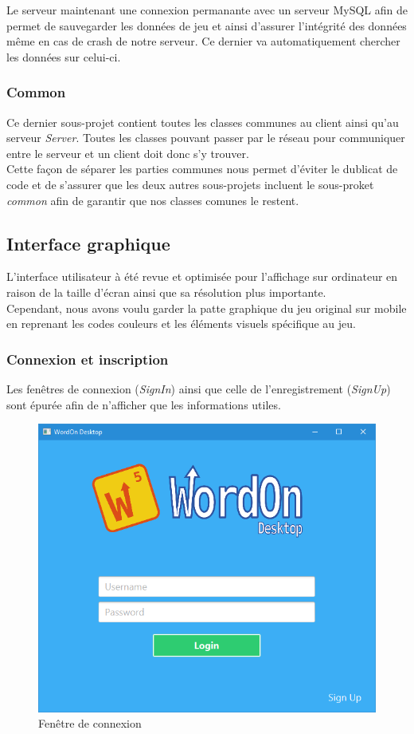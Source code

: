 \documentclass[a4paper,12pt]{article}
\begin{document}
		Le serveur maintenant une connexion permanante avec un serveur MySQL afin de permet de sauvegarder les données de jeu et ainsi d'assurer l'intégrité des données même en cas de crash de notre serveur. Ce dernier va automatiquement chercher les données sur celui-ci.
		
		\subsubsection{Common}
		Ce dernier sous-projet contient toutes les classes communes au client ainsi qu'au serveur \textit{Server}. Toutes les classes pouvant passer par le réseau pour communiquer entre le serveur et un client doit donc s'y trouver. \\
		Cette façon de séparer les parties communes nous permet d'éviter le dublicat de code et de s'assurer que les deux autres sous-projets incluent le sous-proket \textit{common} afin de garantir que nos classes comunes le restent.
	
	
	\subsection{Interface graphique}
	L'interface utilisateur à été revue et optimisée pour l'affichage sur ordinateur en raison de la taille d'écran ainsi que sa résolution plus importante. \\
	Cependant, nous avons voulu garder la patte graphique du jeu original sur mobile en reprenant les codes couleurs et les éléments visuels spécifique au jeu.
	
		\subsubsection{Connexion et inscription}
		Les fenêtres de connexion (\textit{SignIn}) ainsi que celle de l'enregistrement (\textit{SignUp}) sont épurée afin de n'afficher que les informations utiles.
		
		\begin{figure}[h]
			\centering
			\includegraphics[width=0.4\linewidth]{img/signin.jpg}
			\caption{Fenêtre de connexion}
		\end{figure}
	
\end{document}
